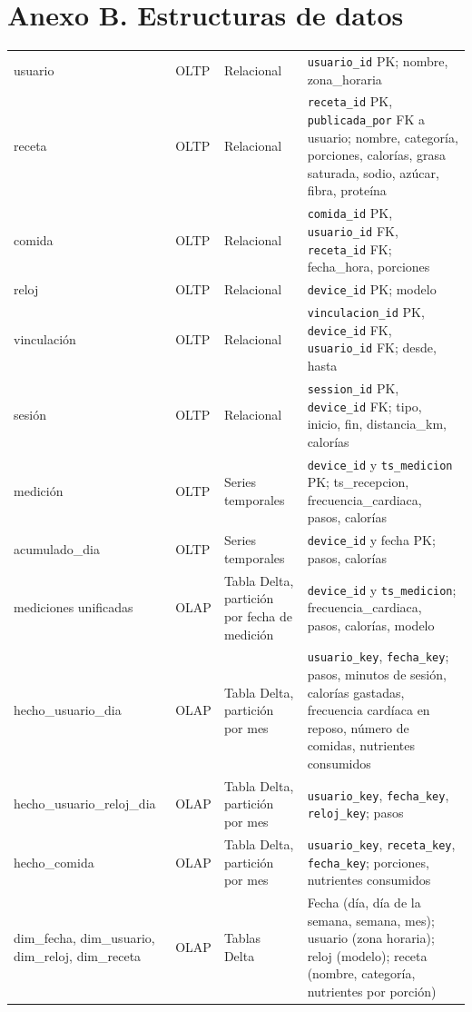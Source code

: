 \documentclass[11pt]{article}
\begin{document}
\section{Anexo B. Estructuras de datos}

\begingroup\iniciartabla\small
\begin{tabularx}{\textwidth}{|L{3.5cm}|L{1.7cm}|L{2.4cm}|Y|}\hline
{} &  &  &
\\\hline
usuario & OLTP & Relacional & \texttt{usuario\_id} PK; nombre, zona\_horaria\\\hline
receta & OLTP & Relacional & \texttt{receta\_id} PK, \texttt{publicada\_por} FK a usuario; nombre, categoría, porciones, calorías, grasa saturada, sodio, azúcar, fibra, proteína\\\hline
comida & OLTP & Relacional & \texttt{comida\_id} PK, \texttt{usuario\_id} FK, \texttt{receta\_id} FK; fecha\_hora, porciones\\\hline
reloj & OLTP & Relacional & \texttt{device\_id} PK; modelo\\\hline
vinculación & OLTP & Relacional & \texttt{vinculacion\_id} PK, \texttt{device\_id} FK, \texttt{usuario\_id} FK; desde, hasta\\\hline
sesión & OLTP & Relacional & \texttt{session\_id} PK, \texttt{device\_id} FK; tipo, inicio, fin, distancia\_km, calorías\\\hline
medición & OLTP & Series temporales & \texttt{device\_id} y \texttt{ts\_medicion} PK; ts\_recepcion, frecuencia\_cardiaca, pasos, calorías\\\hline
acumulado\_dia & OLTP & Series temporales & \texttt{device\_id} y fecha PK; pasos, calorías\\\hline
mediciones unificadas & OLAP & Tabla Delta, partición por fecha de medición & \texttt{device\_id} y \texttt{ts\_medicion}; frecuencia\_cardiaca, pasos, calorías, modelo\\\hline
hecho\_usuario\_dia & OLAP & Tabla Delta, partición por mes & \texttt{usuario\_key}, \texttt{fecha\_key}; pasos, minutos de sesión, calorías gastadas, frecuencia cardíaca en reposo, número de comidas, nutrientes consumidos\\\hline
hecho\_usuario\_\allowbreak reloj\_dia & OLAP & Tabla Delta, partición por mes & \texttt{usuario\_key}, \texttt{fecha\_key}, \texttt{reloj\_key}; pasos\\\hline
hecho\_comida & OLAP & Tabla Delta, partición por mes & \texttt{usuario\_key}, \texttt{receta\_key}, \texttt{fecha\_key}; porciones, nutrientes consumidos\\\hline
dim\_fecha, dim\_usuario, dim\_reloj, dim\_receta & OLAP & Tablas Delta & Fecha (día, día de la semana, semana, mes); usuario (zona horaria); reloj (modelo); receta (nombre, categoría, nutrientes por porción)\\\hline
\end{tabularx}
\endgroup
\end{document}
